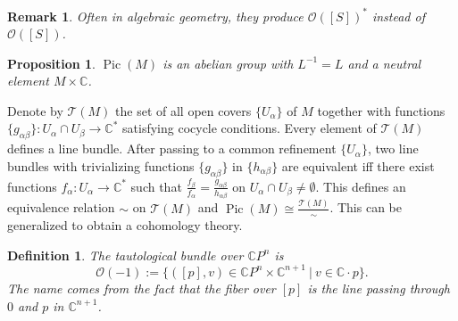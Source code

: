 \documentclass[10pt, a4paper]{article}
\newtheorem{proposition}[thm]{Proposition}
\newtheorem{defi}[thm]{Definition}
\newenvironment{noticeB}{%
  \tcolorbox[%
  notitle,
  empty,
  enhanced,  %
  breakable,
  coltext=black,
  colback=white, 
  fontupper=\rmfamily,
  noparskip,
  sharp corners,
  boxrule=-1pt,  %
  frame hidden,
  left=7pt,  %
  right=7pt,
  top=5pt,
  bottom=5pt,
  before skip=2.5ex plus 2pt,
  after skip=2.5ex plus 2pt,
  borderline west = {1.5pt}{-0.1pt}{blue!30!black}, %
  overlay unbroken and last={%
    \draw[color=black, line width=1.25pt]
    ($(frame.south west)+(1.pt, -0.1pt)$) -- ++(2em, 0);
  }
  ]}
{\endtcolorbox}
\newenvironment{definition}{\begin{noticeB}\begin{defi}}{%
    \end{defi}\end{noticeB}}
\newtheorem*{remark}{Remark}
\newcommand{\C}{\mathbb {C}}
\DeclareMathOperator{\pic}{Pic}
\begin{document}
\begin{remark}
  Often in algebraic geometry, they produce $\mathcal{O} ([S])^*$ instead of $\mathcal{O} ([S])$.
\end{remark}

\begin{proposition}
  $\pic (M)$ is an abelian group with $L^{-1} = L$ and a neutral element $M \times \C$.
\end{proposition}

Denote by $\mathcal{T} (M)$ the set of all open covers $\{U_\alpha\}$ of $M$ together with functions 
$\{g_{\alpha \beta}\}: U_\alpha \cap U_\beta \to \C^*$ satisfying cocycle conditions.
Every element of $\mathcal{T} (M)$ defines a line bundle.
After passing to a common refinement $\{U_\alpha\}$,
two line bundles with trivializing functions $\{g_{\alpha \beta}\}$ in $\{h_{\alpha \beta}\}$ are equivalent iff 
there exist functions $f_\alpha: U_\alpha \to \C^*$ such that $\frac{f_\beta}{f_\alpha} = \frac{g_{\alpha \beta}}{h_{\alpha \beta}}$ on $U_\alpha \cap U_\beta \neq \emptyset$.
This defines an equivalence relation $\sim$ on $\mathcal{T}(M)$ and $\pic (M) \cong \frac{\mathcal{T}(M)}{\sim}$.
This can be generalized to obtain a cohomology theory.

\begin{definition}
  The tautological bundle over $\C P^n$ is 
  $$\mathcal{O} (-1) := \{([p], v) \in \C P^n \times \C^{n + 1}\ |\ v \in \C \cdot p\}.$$
  The name comes from the fact that the fiber over $[p]$ is the line passing through $0$ and $p$ in $\C^{n + 1}$.
\end{definition}
  
\end{document}
